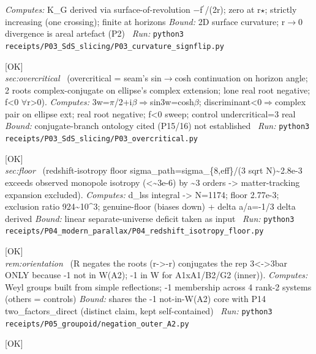 \begin{description}
\emph{Computes:} K\_G derived via surface-of-revolution \ensuremath{-}f\ensuremath{{}^\prime}/(2r); zero at r\ensuremath{\star}; strictly increasing (one crossing); finite at horizons
 \emph{Bound:} 2D surface curvature; r\ensuremath{\to}0 divergence is areal artefact (P2)
\ \emph{Run:} \texttt{python3 receipts/P03\_SdS\_slicing/P03\_curvature\_signflip.py}
\item[\label{rcpt:P03_overcritical}\texttt{P03\_overcritical}]\hfill\textsf{[OK]}\\
\textit{sec:overcritical} \ (overcritical = seam's sin\ensuremath{\to}cosh continuation on horizon angle; 2 roots complex-conjugate on ellipse's complex extension; lone real root negative; f<0 \ensuremath{\forall}r>0). 
\emph{Computes:} 3w=\ensuremath{\pi}/2+i\ensuremath{\beta}\ensuremath{\Rightarrow}sin3w=cosh\ensuremath{\beta}; discriminant<0\ensuremath{\Rightarrow}complex pair on ellipse ext; real root negative; f<0 sweep; control undercritical=3 real
 \emph{Bound:} conjugate-branch ontology cited (P15/16) not established
\ \emph{Run:} \texttt{python3 receipts/P03\_SdS\_slicing/P03\_overcritical.py}
\item[\label{rcpt:P04_redshift_isotropy_floor}\texttt{P04\_redshift\_isotropy\_floor}]\hfill\textsf{[OK]}\\
\textit{sec:floor} \ (redshift-isotropy floor sigma\_path=sigma\_\{8,eff\}/(3 sqrt N)\textasciitilde{}2.8e-3 exceeds observed monopole isotropy (<\textasciitilde{}3e-6) by \textasciitilde{}3 orders -> matter-tracking expansion excluded). 
\emph{Computes:} d\_lss integral -> N=1174; floor 2.77e-3; exclusion ratio 924\textasciitilde{}10\textasciicircum{}3; genuine-floor (biases down) + delta a/a=-1/3 delta derived
 \emph{Bound:} linear separate-universe deficit taken as input
\ \emph{Run:} \texttt{python3 receipts/P04\_modern\_parallax/P04\_redshift\_isotropy\_floor.py}
\item[\label{rcpt:negation_outer_A2}\texttt{negation\_outer\_A2}]\hfill\textsf{[OK]}\\
\textit{rem:orientation} \ (R negates the roots (r->-r) conjugates the rep 3<->3bar ONLY because -1 not in W(A2); -1 in W for A1xA1/B2/G2 (inner)). 
\emph{Computes:} Weyl groups built from simple reflections; -1 membership across 4 rank-2 systems (others = controls)
 \emph{Bound:} shares the -1 not-in-W(A2) core with P14 two\_factors\_direct (distinct claim, kept self-contained)
\ \emph{Run:} \texttt{python3 receipts/P05\_groupoid/negation\_outer\_A2.py}
\item[\label{rcpt:P05_deck_group_S3}\texttt{P05\_deck\_group\_S3}]\hfill\textsf{[OK]}\\

\end{description}
